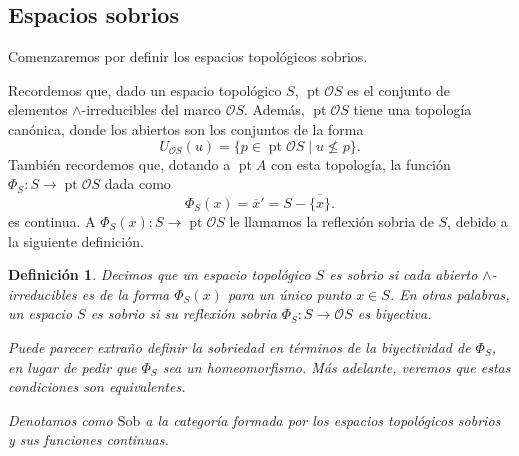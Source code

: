 \documentclass[12pt,letterpaper,titlepage]{article}
\newtheorem*{defn}{Definición}
\theoremstyle{definition}
\newcommand\ol[1]{\overline{#1}}
\renewcommand\inf{\wedge}
\renewcommand\cal[1]{\mathcal{#1}}
\newcommand\<{\langle}
\renewcommand\>{\rangle}
\newcommand{\Sob}{\mathrm{Sob}}
\DeclareMathOperator{\pt}{pt}
\begin{document}
\subsection{Espacios sobrios}
Comenzaremos por definir los espacios topológicos sobrios.

Recordemos que, dado un espacio topológico $S$,
$\pt\cal OS$ es el conjunto de elementos
$\inf$-irreducibles del marco $\cal OS$.
Además, $\pt\cal OS$ tiene una topología canónica,
donde los abiertos son los conjuntos de la forma
\[
    U_{\cal OS}(u) = \{p\in\pt\cal OS \mid u\nleq p\}
.\]
También recordemos que, dotando a $\pt A$ con esta topología,
la función $\Phi_S:S\to\pt\cal OS$ dada como
\[
    \Phi_S(x) = \ol{x}' = S-\ol{\{x\}}.
\]
es continua.
A $\Phi_S(x):S\to\pt\cal OS$ le llamamos
la reflexión sobria de $S$, debido a la siguiente definición.

\begin{defn}
    Decimos que un espacio topológico $S$ es sobrio si
    cada abierto $\inf$-irreducibles es de la forma
    $\Phi_S(x)$ para un único punto $x\in S$.
    En otras palabras, un espacio $S$ es sobrio
    si su reflexión sobria $\Phi_S:S\to\cal OS$ es biyectiva.
    
    Puede parecer extraño definir la sobriedad en términos de
    la biyectividad de $\Phi_S$, en lugar de pedir que $\Phi_S$
    sea un homeomorfismo.
    Más adelante, veremos que estas condiciones son equivalentes.
    
    Denotamos como $\Sob$ a la categoría formada por
    los espacios topológicos sobrios y sus funciones continuas.
\end{defn}
\end{document}
